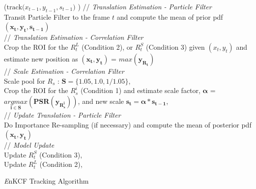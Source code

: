\documentclass[10pt,twocolumn,letterpaper]{article}
\begin{document}
\begin{algorithm*}[h]
\small
\DontPrintSemicolon
{}
\Begin($\text{track($x_{t-1},y_{t-1},s_{t-1}$) }$)
{
 	// \textit{Translation Estimation - Particle Filter} \\
	Transit Particle Filter to the frame $t$ and compute the mean of prior pdf $\mathbf{(x_{t},y_{t},s_{t-1})}$ \\
     // \textit{Translation Estimation - Correlation Filter} \\
	Crop the ROI for the $R_{t}^{L}$ (Condition 2), or $R_{t}^{S}$ (Condition 3) given $(x_{t},y_{t})$ and estimate new position as $\mathbf{(x_{t},y_{t})}$ = $\mathbf{\textit{max}(y_{R_{t}})}$\\
	// \textit{Scale Estimation - Correlation Filter}\\
	Scale pool for $R_{s}$ : $\mathbf{S} = \lbrace1.05,1.0,1/1.05\rbrace$,\\
	Crop the ROI for the $R_{s}^{i}$ (Condition 1) and estimate scale factor, $\mathbf{\alpha}$ = $\mathbf{\underset{i\in S}{\textit{argmax}}(PSR(y_{R_{s}^{i}}))}$, and new scale $\mathbf{s_{t} = \alpha * s_{t-1}}$,\\ 
	// \textit{Update Translation - Particle Filter}\\
	Do Importance Re-sampling (if necessary) and compute the 
	mean of posterior pdf $\mathbf{(x_{t},y_{t})}$\\
	// \textit{Model Update}\\
	Update $R_{t}^{S}$ (Condition 3),\\
	Update $R_{t}^{L}$ (Condition 2),\\
  \label{endfor}
}
\caption{{\it E}nKCF Tracking Algorithm}\label{alg:MKCF}
\end{algorithm*}
\end{document}
